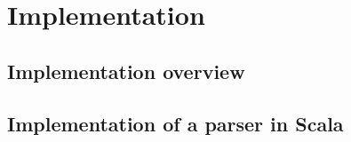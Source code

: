 \section{Implementation}

\subsection{Implementation overview}

\subsection{Implementation of a parser in Scala}

